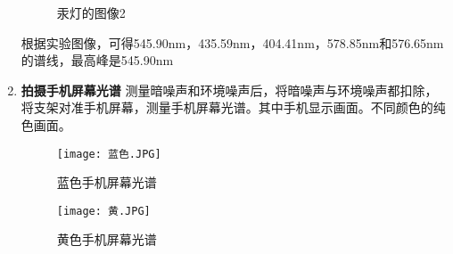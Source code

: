 \documentclass[dvipsnames, svgnames,a4paper,11pt]{article}
\begin{document}
\begin{enumerate}
\begin{figure}[H]
\begin{minipage}{0.35\textwidth}
				\label{fig:mercury_lamp2}
			\end{minipage}
		 \caption{汞灯的图像2}
			\label{fig:mercury_lamps}
		\end{figure}
		根据实验图像，可得545.90nm，435.59nm，404.41nm，578.85nm和576.65nm的谱线，最高峰是545.90nm
		\item \textbf{拍摄手机屏幕光谱}
		测量暗噪声和环境噪声后，将暗噪声与环境噪声都扣除，将支架对准手机屏幕，测量手机屏幕光谱。其中手机显示画面。不同颜色的纯色画面。
		\begin{figure}[{H}]
			\centering
			\texttt{[image: 蓝色.JPG]}
			\caption{蓝色手机屏幕光谱}
			\label{}
		\end{figure}
		\begin{figure}[{H}]
			\centering
			\texttt{[image: 黄.JPG]}
			\caption{黄色手机屏幕光谱}
			\label{}
		\end{figure}
				
	\end{enumerate}	
\end{document}
